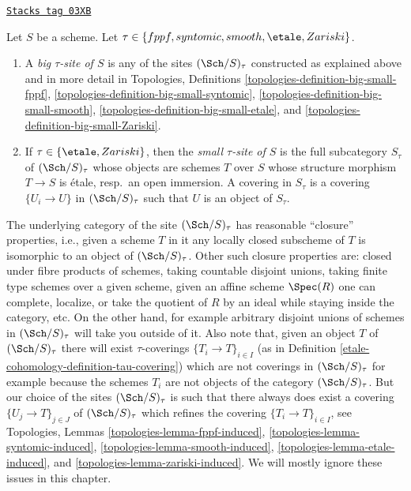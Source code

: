 \begin{definition}
\label{etale-cohomology-definition-tau-site}
\href{https://stacks.math.columbia.edu/tag/03XB}{\texttt{Stacks tag 03XB}}

Let $S$ be a scheme.
Let $\tau \in \{fppf, syntomic, smooth, \etale, \linebreak[0] Zariski\}$.
\begin{enumerate}
\item A {\it big $\tau$-site of $S$} is any of the sites
$(\Sch/S)_\tau$ constructed as explained above and in more detail in
Topologies, Definitions
\ref{topologies-definition-big-small-fppf},
\ref{topologies-definition-big-small-syntomic},
\ref{topologies-definition-big-small-smooth},
\ref{topologies-definition-big-small-etale}, and
\ref{topologies-definition-big-small-Zariski}.
\item If $\tau \in \{\etale, Zariski\}$, then the
{\it small $\tau$-site of $S$}
is the full subcategory $S_\tau$ of $(\Sch/S)_\tau$ whose objects
are schemes $T$ over $S$ whose structure morphism $T \to S$ is \'etale,
resp.\ an open immersion. A covering in $S_\tau$ is a covering
$\{U_i \to U\}$ in $(\Sch/S)_\tau$
such that $U$ is an object of $S_\tau$.
\end{enumerate}
\end{definition}

The underlying category of the site $(\Sch/S)_\tau$ has reasonable
``closure'' properties, i.e., given a scheme $T$ in it any locally closed
subscheme of $T$ is isomorphic to an object of $(\Sch/S)_\tau$.
Other such closure properties are: closed under fibre products of schemes,
taking countable disjoint unions,
taking finite type schemes over a given scheme, given an affine scheme
$\Spec(R)$ one can complete, localize, or take the quotient of $R$
by an ideal while staying inside the category, etc.
On the other hand, for example arbitrary disjoint unions
of schemes in $(\Sch/S)_\tau$ will take you outside of it.
Also note that, given an object $T$ of $(\Sch/S)_\tau$ there will exist
$\tau$-coverings $\{T_i \to T\}_{i \in I}$ (as in
Definition \ref{etale-cohomology-definition-tau-covering})
which are not coverings in $(\Sch/S)_\tau$ for example
because the schemes $T_i$ are not objects of the category
$(\Sch/S)_\tau$. But our choice of the sites $(\Sch/S)_\tau$
is such that there always does exist
a covering $\{U_j \to T\}_{j \in J}$ of $(\Sch/S)_\tau$ which refines
the covering $\{T_i \to T\}_{i \in I}$, see
Topologies, Lemmas
\ref{topologies-lemma-fppf-induced},
\ref{topologies-lemma-syntomic-induced},
\ref{topologies-lemma-smooth-induced},
\ref{topologies-lemma-etale-induced}, and
\ref{topologies-lemma-zariski-induced}.
We will mostly ignore these issues in this chapter.


